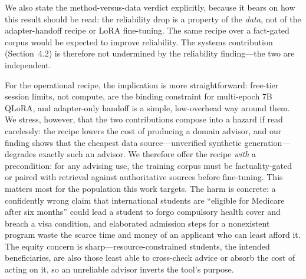 \documentclass[11pt, a4paper]{article}
\begin{document}
We also state the method-versus-data verdict explicitly, because it bears on how this result should be read: the reliability drop is a property of the \emph{data}, not of the adapter-handoff recipe or LoRA fine-tuning. The same recipe over a fact-gated corpus would be expected to improve reliability. The systems contribution (Section~4.2) is therefore not undermined by the reliability finding---the two are independent.

For the operational recipe, the implication is more straightforward: free-tier session limits, not compute, are the binding constraint for multi-epoch 7B QLoRA, and adapter-only handoff is a simple, low-overhead way around them. We stress, however, that the two contributions compose into a hazard if read carelessly: the recipe lowers the cost of producing a domain advisor, and our finding shows that the cheapest data source---unverified synthetic generation---degrades exactly such an advisor. We therefore offer the recipe \emph{with} a precondition: for any advising use, the training corpus must be factuality-gated or paired with retrieval against authoritative sources before fine-tuning. This matters most for the population this work targets. The harm is concrete: a confidently wrong claim that international students are ``eligible for Medicare after six months'' could lead a student to forgo compulsory health cover and breach a visa condition, and elaborated admission steps for a nonexistent program waste the scarce time and money of an applicant who can least afford it. The equity concern is sharp---resource-constrained students, the intended beneficiaries, are also those least able to cross-check advice or absorb the cost of acting on it, so an unreliable advisor inverts the tool's purpose.
\end{document}
